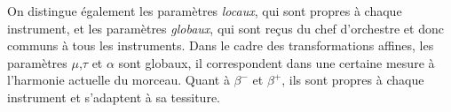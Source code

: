 On distingue également les paramètres \emph{locaux}, qui sont propres à chaque instrument, et les paramètres \emph{globaux}, qui sont reçus du chef d'orchestre et donc communs à tous les instruments. Dans le cadre des transformations affines, les paramètres $\mu$,$\tau$ et $\alpha$ sont globaux, il correspondent dans une certaine mesure à l'harmonie actuelle du morceau. Quant à $\beta^-$ et $\beta^+$, ils sont propres à chaque instrument et s'adaptent à sa tessiture.


